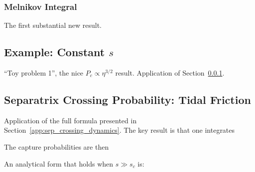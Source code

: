 \documentclass[
        fleqn,
        usenatbib,
        referee,
    ]{mnras}
\begin{document}
\subsubsection{Melnikov Integral}\label{sss:Melnikov}

The first substantial new result.

\subsection{Example: Constant $s$}

``Toy problem 1'', the nice $P_c \propto \eta^{3/2}$ result. Application of
Section~\ref{sss:Melnikov}.

\subsection{Separatrix Crossing Probability: Tidal Friction}\label{app:probs}

Application of the full formula presented in
Section~\ref{app:sep_crossing_dynamics}. The key result is that one integrates


The capture probabilities are then


An analytical form that holds when $s \gg s_c$ is:


\bsp
\label{lastpage} %
\end{document}
